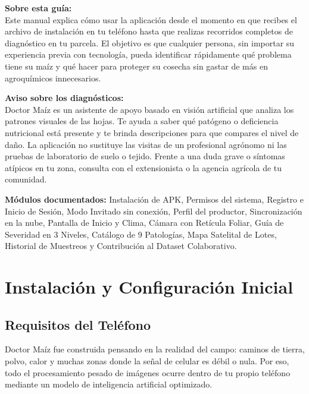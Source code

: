 \documentclass[11pt,a4paper]{report}
\begin{document}
\vspace{0.8cm}
\noindent\textbf{Sobre esta guía:}\\
\small
Este manual explica cómo usar la aplicación desde el momento en que recibes el archivo de instalación en tu teléfono hasta que realizas recorridos completos de diagnóstico en tu parcela. El objetivo es que cualquier persona, sin importar su experiencia previa con tecnología, pueda identificar rápidamente qué problema tiene su maíz y qué hacer para proteger su cosecha sin gastar de más en agroquímicos innecesarios.

\vspace{0.6cm}
\noindent\textbf{Aviso sobre los diagnósticos:}\\
Doctor Maíz es un asistente de apoyo basado en visión artificial que analiza los patrones visuales de las hojas. Te ayuda a saber qué patógeno o deficiencia nutricional está presente y te brinda descripciones para que compares el nivel de daño. La aplicación no sustituye las visitas de un profesional agrónomo ni las pruebas de laboratorio de suelo o tejido. Frente a una duda grave o síntomas atípicos en tu zona, consulta con el extensionista o la agencia agrícola de tu comunidad.

\vfill
\noindent\textbf{Módulos documentados:} Instalación de APK, Permisos del sistema, Registro e Inicio de Sesión, Modo Invitado sin conexión, Perfil del productor, Sincronización en la nube, Pantalla de Inicio y Clima, Cámara con Retícula Foliar, Guía de Severidad en 3 Niveles, Catálogo de 9 Patologías, Mapa Satelital de Lotes, Historial de Muestreos y Contribución al Dataset Colaborativo.

\newpage

\tableofcontents
\newpage

\setcounter{page}{1}

\chapter{Instalación y Configuración Inicial}

\section{Requisitos del Teléfono}
Doctor Maíz fue construida pensando en la realidad del campo: caminos de tierra, polvo, calor y muchas zonas donde la señal de celular es débil o nula. Por eso, todo el procesamiento pesado de imágenes ocurre dentro de tu propio teléfono mediante un modelo de inteligencia artificial optimizado.
\end{document}
